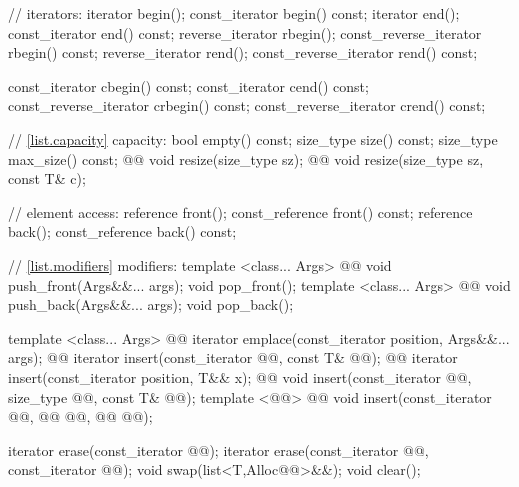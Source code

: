\documentclass[american,twoside]{book}
\begin{document}
\begin{codeblock}
{{    // iterators:
    iterator               begin();
    const_iterator         begin() const;
    iterator               end();
    const_iterator         end() const;
    reverse_iterator       rbegin();
    const_reverse_iterator rbegin() const;
    reverse_iterator       rend();
    const_reverse_iterator rend() const;

    const_iterator         cbegin() const;
    const_iterator         cend() const;
    const_reverse_iterator crbegin() const;
    const_reverse_iterator crend() const;

    // \ref{list.capacity} capacity:
    bool      empty() const;
    size_type size() const;
    size_type max_size() const;
    @@ void resize(size_type sz);
    @@ void resize(size_type sz, const T& c);

    // element access:
    reference       front();
    const_reference front() const;
    reference       back();
    const_reference back() const;

    // \ref{list.modifiers} modifiers:
    template <class... Args> 
      @@
      void push_front(Args&&... args);
    void pop_front();
    template <class... Args> 
      @@
      void push_back(Args&&... args);
    void pop_back();

    template <class... Args> 
      @@
      iterator emplace(const_iterator position, Args&&... args);
    @@ 
      iterator insert(const_iterator @@, const T& @@);
    @@ 
      iterator insert(const_iterator position, T&& x);
    @@ 
      void insert(const_iterator @@, size_type @@, const T& @@);
    template <@@>
      @@
      void insert(const_iterator @@, @@ @@,
                  @@ @@);

    iterator erase(const_iterator @@);
    iterator erase(const_iterator @@, const_iterator @@);
    void     swap(list<T,Alloc@@>&&);
    void     clear();

}}
\end{codeblock}
\end{document}
